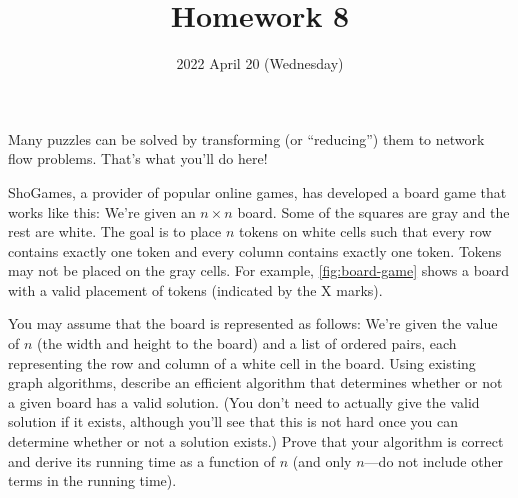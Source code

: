 \documentclass{ks-pset}
\title{Homework 8}
\date{2022 April 20 (Wednesday)}
\author{}
\begin{document}
\begin{problem}[Shodoku!, 35]

  Many puzzles can be solved by transforming (or ``reducing'') them to network
  flow problems.  That's what you'll do here!

  ShoGames, a provider of popular online games, has developed a board game that
  works like this:  We're given an \(n×n\) board.  Some of the squares are gray
  and the rest are white.  The goal is to place \(n\) tokens on white cells such
  that every row contains exactly one token and every column contains exactly
  one token.  Tokens may not be placed on the gray cells.  For example,
  \cref{fig:board-game} shows a board with a valid placement of tokens
  (indicated by the X marks).

  \begin{center}
    \label{fig:board-game}
  \end{center}

  You may assume that the board is represented as follows:  We're given the
  value of \(n\) (the width and height to the board) and a list of ordered
  pairs, each representing the row and column of a white cell in the board.
  Using existing graph algorithms, describe an efficient algorithm that
  determines whether or not a given board has a valid solution.  (You don't need
  to actually give the valid solution if it exists, although you'll see that
  this is not hard once you can determine whether or not a solution exists.)
  Prove that your algorithm is correct and derive its running time as a function
  of \(n\) (and only \(n\)---do not include other terms in the running time).

\end{problem}
\end{document}

